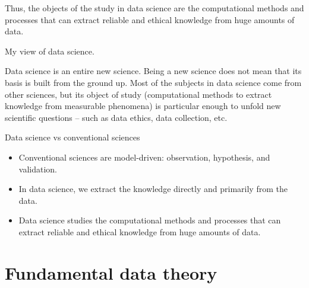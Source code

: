 Thus, the objects of the
study in data science are the computational methods and processes that can extract
reliable and ethical knowledge from huge amounts of data.

\def\verrids{(0,0) circle (20mm)}
\def\verrist{(-2.5,0) circle (15mm)}
\def\verride {(2.5,0) circle (15mm)}
\def\verrics {(0,-2.5) circle (15mm)}

\begin{figurebox}[label=fig:myview]{My view of data science.}
  \centering
  \tcblower
    Data science is an entire new science.  Being a new science
    does not mean that its basis is built from the ground up.  Most of the subjects in
    data science come from other sciences, but its object of study (computational methods
    to extract knowledge from measurable phenomena) is particular enough to unfold
    new scientific questions -- such as data ethics, data collection, etc.
\end{figurebox}

\begin{slidebox}{Data science vs conventional sciences}{}
  \begin{itemize}
    \item Conventional sciences are model-driven: observation, hypothesis, and validation.
    \item In data science, we extract the knowledge directly and primarily from the data.
    \item Data science studies the computational methods and processes that can extract
      reliable and ethical knowledge from huge amounts of data.
  \end{itemize}
\end{slidebox}

\section{Fundamental data theory}

